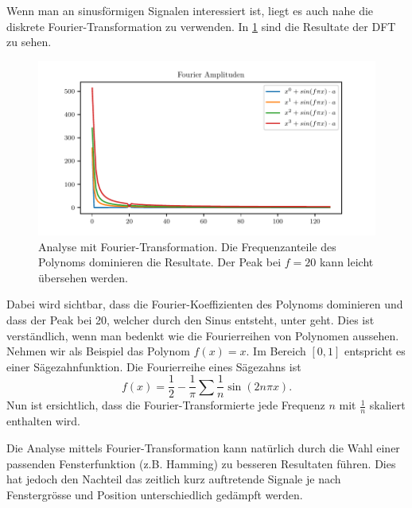 \begin{refsection}
Wenn man an sinusförmigen Signalen interessiert ist, liegt es auch nahe die
diskrete Fourier-Transformation zu verwenden. In \cref{polynomials:sin:fft}
sind die Resultate der DFT zu sehen.
\begin{figure}
    \centering
    \includegraphics{papers/polynomials/images/polynomials_sin_fft.pdf}
    \caption{Analyse mit Fourier-Transformation. Die Frequenzanteile des
             Polynoms dominieren die Resultate. Der Peak bei $f=20$ kann leicht
             übersehen werden.\label{polynomials:sin:fft}}
\end{figure}
Dabei wird sichtbar, dass die Fourier-Koeffizienten des Polynoms dominieren und
dass der Peak bei 20, welcher durch den Sinus entsteht, unter geht. Dies ist
verständlich, wenn man bedenkt wie die Fourierreihen von Polynomen aussehen.
Nehmen wir als Beispiel das Polynom $f(x) = x$. Im Bereich $[0, 1]$ entspricht
es einer Sägezahnfunktion. Die Fourierreihe eines Sägezahns ist \[f(x) =
\frac{1}{2} - \frac{1}{\pi} \sum{\frac{1}{n} \sin(2 n \pi x)}.\] Nun ist
ersichtlich, dass die Fourier-Transformierte jede Frequenz $n$ mit
$\frac{1}{n}$ skaliert enthalten wird.

Die Analyse mittels Fourier-Transformation kann natürlich durch die Wahl einer
passenden Fensterfunktion (z.B. Hamming) zu besseren Resultaten führen. Dies
hat jedoch den Nachteil das zeitlich kurz auftretende Signale je nach
Fenstergrösse und Position unterschiedlich gedämpft werden.


\end{refsection}
